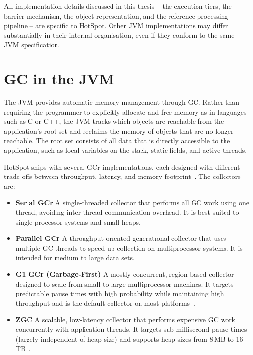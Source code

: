 All implementation details discussed in this thesis -- the execution tiers, the barrier mechanism, the object representation, and the reference-processing pipeline -- are specific to HotSpot. Other \ac{JVM} implementations may differ substantially in their internal organisation, even if they conform to the same \ac{JVM} specification.

\section{GC in the JVM}
\label{sec:bg-gc}

The \ac{JVM} provides automatic memory management through \ac{GC}. Rather than requiring the programmer to explicitly allocate and free memory as in languages such as C or C++, the \ac{JVM} tracks which objects are reachable from the application's root set and reclaims the memory of objects that are no longer reachable. The root set consists of all data that is directly accessible to the application, such as local variables on the stack, static fields, and active threads.

HotSpot ships with several \ac{GCr} implementations, each designed with different trade-offs between throughput, latency, and memory footprint~\cite{oracle-gc-collectors}. The collectors are:

\begin{itemize}
    \item \textbf{Serial \ac{GCr}}   A single-threaded collector that performs all \ac{GC} work using one thread, avoiding inter-thread communication overhead. It is best suited to single-processor systems and small heaps.
    \item \textbf{Parallel \ac{GCr}}   A throughput-oriented generational collector that uses multiple \ac{GC} threads to speed up collection on multiprocessor systems. It is intended for medium to large data sets.
    \item \textbf{G1 \ac{GCr} (Garbage-First)}   A mostly concurrent, region-based collector designed to scale from small to large multiprocessor machines. It targets predictable pause times with high probability while maintaining high throughput and is the default collector on most platforms~\cite{oracle-gc-collectors}.
    \item \textbf{\ac{ZGC}}   A scalable, low-latency collector that performs expensive \ac{GC} work concurrently with application threads. It targets sub-millisecond pause times (largely independent of heap size) and supports heap sizes from 8\,MB to 16\,TB~\cite{jep333-zgc,jep377-zgc-prod,jep439-genzgc,osterlund23-genzgc-beyond}.
\end{itemize}

